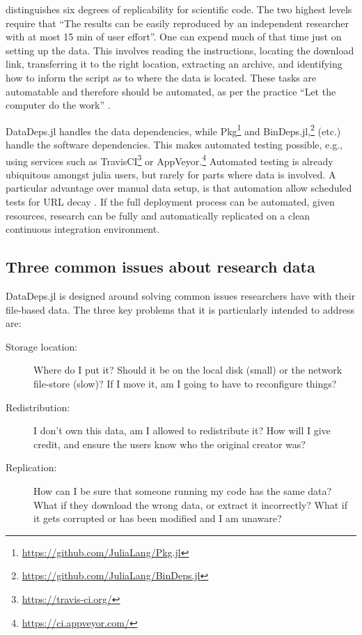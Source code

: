 \documentclass{book}
\begin{document}
\citet{VabdewakkeReproduceableResearch} distinguishes six degrees of replicability for scientific code.
The two highest levels
require that ``The results can be easily reproduced by an independent researcher with at most 15 min of user effort''.
One can  expend much of that time just on setting up the data.
This involves reading the instructions, locating the download link, transferring it to the right location, extracting an archive, and identifying how to inform the script as to where the data is located.
These tasks are automatable and therefore should be automated, as per the practice  ``Let the computer do the work'' \citep{10.1371/journal.pbio.1001745}.


DataDeps.jl handles the data dependencies, while Pkg\footnote{\url{https://github.com/JuliaLang/Pkg.jl}} 
and BinDeps.jl,\footnote{\url{https://github.com/JuliaLang/BinDeps.jl}}
 (etc.) handle the software dependencies.
This makes automated testing possible, e.g., using services such as 
TravisCI\footnote{\url{https://travis-ci.org/}} or AppVeyor.\footnote{\url{https://ci.appveyor.com/}}
Automated testing is already ubiquitous amongst julia users, but rarely for parts where data is involved.
A particular advantage over manual data setup, is that automation allow scheduled tests for URL decay \citep{wren2008url}.
If the full deployment process can be automated, given resources, research can be fully and automatically replicated on a clean continuous integration environment.


\subsection{Three common issues about research data}
\label{sec:issues}
DataDeps.jl is designed around solving common issues researchers have with their file-based data.
The three key problems that it is particularly intended to address are:
%
\begin{description}
	\item[Storage location:] Where do I put it? \label{itm:where}
	Should it be on the local disk (small) or the network file-store (slow)?
	If I move it, am I going to have to reconfigure things?
	\item[Redistribution:] I don't own this data, am I allowed to redistribute it? \label{itm:ownredistribute} 
	How will I give credit, and ensure the users know who the original creator was?
	\item[Replication:] How can I be sure that someone running my code has the same data?
	What if they download the wrong data, or extract it incorrectly?
	What if it gets corrupted or has been modified and I am unaware?
\end{description}
%
\end{document}
